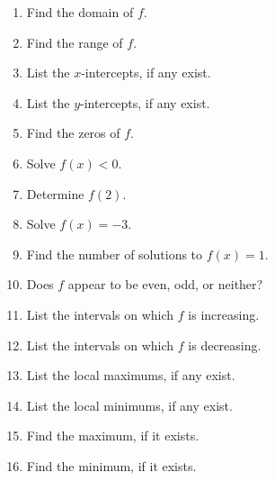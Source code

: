 \documentclass[11pt]{article}
\begin{document}
\begin{enumerate}
\begin{center}
\end{center}

\begin{multicols}{2}
\begin{enumerate}

\item  Find the domain of $f$.

\item  Find the range of $f$.


\item  List the $x$-intercepts, if any exist.

\item  List the $y$-intercepts, if any exist.



\item  Find the zeros of $f$.

\item  Solve $f(x) < 0$.



\item  Determine $f(2)$.

\item  Solve $f(x) = -3$.  



\item  Find the number of solutions to $f(x) = 1$.

\item  Does $f$ appear to be even, odd, or neither?



\item  List the intervals on which $f$ is increasing.

\item  List the intervals on which $f$ is decreasing.



\item  List the local maximums, if any exist.

\item  List the local minimums, if any exist.



\item  Find the maximum, if it exists.

\item  Find the minimum, if it exists.


\end{enumerate}
\end{multicols}
\end{enumerate}
\end{document}
